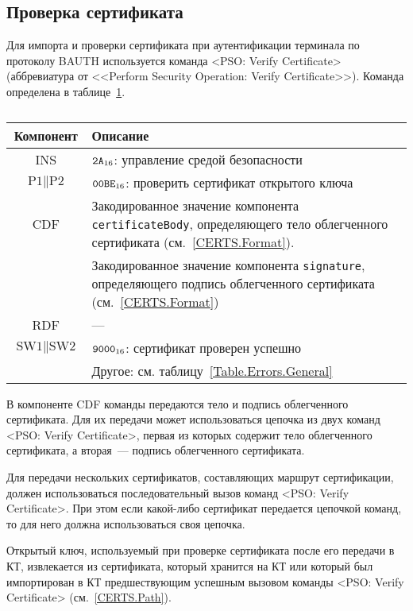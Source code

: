 \subsection{Проверка сертификата}
\label{Oper.Descr.VerifyCert}

Для импорта и проверки сертификата при аутентификации терминала 
по протоколу BAUTH используется команда 
<PSO: Verify Certificate> (аббревиатура от <<Perform Security 
Operation: Verify Certificate>>).
Команда определена в таблице~\ref{Table.Oper.VerifyCertCmd}.

\begin{table}[hbt]
\caption{}\label{Table.Oper.VerifyCertCmd}
\begin{tabular}{|c|p{14cm}|}
\hline
Компонент & Описание\\ 
\hline
\hline
INS & $\texttt{2A}_{16}$: управление средой безопасности \\
\hline
$\text{P1} \parallel \text{P2}$ & $\texttt{00BE}_{16}$: проверить 
сертификат открытого ключа \\ 
\hline
CDF  & Закодированное значение компонента \verb|certificateBody|, определяющего тело 
облегченного сертификата (см.~\ref{CERTS.Format}).\\
 & Закодированное значение компонента \verb|signature|, определяющего подпись 
облегченного сертификата (см.~\ref{CERTS.Format})\\
\hline 
RDF &  --- \\
\hline
$\text{SW1} \parallel \text{SW2}$ & $\texttt{9000}_{16}$: сертификат проверен успешно \\
\cline{2-2}
 & Другое: см. таблицу~\ref{Table.Errors.General} \\
\hline
\end{tabular}
\end{table}

В компоненте CDF команды передаются тело и подпись облегченного сертификата.
Для их передачи может использоваться цепочка из двух команд 
<PSO: Verify Certificate>, первая из которых содержит тело 
облегченного сертификата, а вторая~--- подпись облегченного сертификата.

Для передачи нескольких сертификатов, составляющих маршрут 
сертификации, должен использоваться последовательный 
вызов команд <PSO: Verify Certificate>. 
При этом если какой-либо сертификат передается цепочкой команд, 
то для него должна использоваться своя цепочка.

Открытый ключ, используемый при проверке сертификата после его передачи в
КТ, извлекается из сертификата, который хранится на КТ или который был 
импортирован в КТ предшествующим успешным вызовом 
команды <PSO: Verify Certificate> (см.~\ref{CERTS.Path}).

